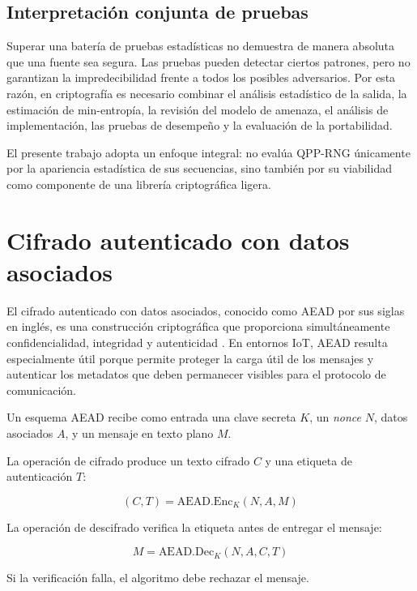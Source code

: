\subsection{Interpretación conjunta de pruebas}

Superar una batería de pruebas estadísticas no demuestra de manera absoluta que una fuente sea segura. Las pruebas pueden detectar ciertos patrones, pero no garantizan la impredecibilidad frente a todos los posibles adversarios. Por esta razón, en criptografía es necesario combinar el análisis estadístico de la salida, la estimación de min-entropía, la revisión del modelo de amenaza, el análisis de implementación, las pruebas de desempeño y la evaluación de la portabilidad.

El presente trabajo adopta un enfoque integral: no evalúa QPP-RNG únicamente por la apariencia estadística de sus secuencias, sino también por su viabilidad como componente de una librería criptográfica ligera.


\section{Cifrado autenticado con datos asociados}
\label{sec:aead}

El cifrado autenticado con datos asociados, conocido como AEAD por sus siglas en inglés, es una construcción criptográfica que proporciona simultáneamente confidencialidad, integridad y autenticidad \cite{Katz2020IntroductionCryptography}. En entornos IoT, AEAD resulta especialmente útil porque permite proteger la carga útil de los mensajes y autenticar los metadatos que deben permanecer visibles para el protocolo de comunicación.

Un esquema AEAD recibe como entrada una clave secreta $K$, un \textit{nonce} $N$, datos asociados $A$, y un mensaje en texto plano $M$.

La operación de cifrado produce un texto cifrado $C$ y una etiqueta de autenticación $T$:

\begin{equation}
    (C,T) = \text{AEAD.Enc}_{K}(N,A,M)
\end{equation}

La operación de descifrado verifica la etiqueta antes de entregar el mensaje:

\begin{equation}
    M = \text{AEAD.Dec}_{K}(N,A,C,T)
\end{equation}

Si la verificación falla, el algoritmo debe rechazar el mensaje.

